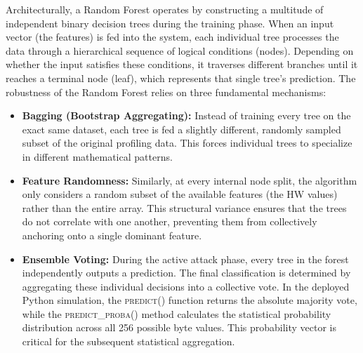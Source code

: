 \documentclass[11pt,a4paper]{report}
\begin{document}
Architecturally, a Random Forest operates by constructing a multitude of independent binary decision trees during the training phase. 
When an input vector (the features) is fed into the system, each individual tree processes the data through a hierarchical sequence of logical conditions (nodes). 
Depending on whether the input satisfies these conditions, it traverses different branches until it reaches a terminal node (leaf), which represents that single tree's prediction.
The robustness of the Random Forest relies on three fundamental mechanisms:
\begin{itemize}
    \item \textbf{Bagging (Bootstrap Aggregating):} Instead of training every tree on the exact same dataset, each tree is fed a slightly different, randomly sampled subset of the original profiling data. 
    This forces individual trees to specialize in different mathematical patterns.

    \item \textbf{Feature Randomness:} Similarly, at every internal node split, the algorithm only considers a random subset of the available features (the HW values) rather than the entire array. 
    This structural variance ensures that the trees do not correlate with one another, preventing them from collectively anchoring onto a single dominant feature.

    \item \textbf{Ensemble Voting:} During the active attack phase, every tree in the forest independently outputs a prediction. 
    The final classification is determined by aggregating these individual decisions into a collective vote. 
    In the deployed Python simulation, the \textsc{predict()} function returns the absolute majority vote, 
    while the \textsc{predict\_proba()} method calculates the statistical probability distribution across all 256 possible byte values. 
    This probability vector is critical for the subsequent statistical aggregation.
\end{itemize}
\end{document}
